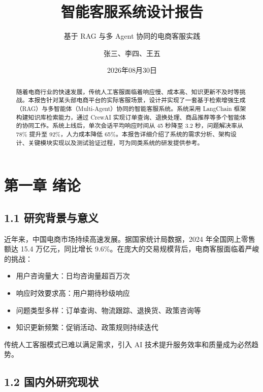\documentclass{harryopo-report}
\title{智能客服系统设计报告}
\subtitle{基于 RAG 与多 Agent 协同的电商客服实践}
\author{张三、李四、王五}
\institute{计算机学院 计算机应用技术}
\date{2026年08月30日}
\begin{document}
\maketitle

\begin{abstract}
随着电商行业的快速发展，传统人工客服面临着响应慢、成本高、知识更新不及时等挑战。本报告针对某头部电商平台的实际客服场景，设计并实现了一套基于检索增强生成（RAG）与多智能体（Multi-Agent）协同的智能客服系统。系统采用 LangChain 框架构建知识库检索能力，通过 CrewAI 实现订单查询、退换处理、商品推荐等多个智能体的协同工作。系统上线后，单次会话平均响应时间从 45 秒降至 3.2 秒，问题解决率从 78\% 提升至 92\%，人力成本降低 65\%。本报告详细介绍了系统的需求分析、架构设计、关键模块实现以及测试验证过程，可为同类系统的研发提供参考。
\end{abstract}

\tableofcontents

\chapter*{第一章 绪论}

\section*{1.1 研究背景与意义}

近年来，中国电商市场持续高速发展。据国家统计局数据，2024 年全国网上零售额达 15.4 万亿元，同比增长 9.6\%。在庞大的交易规模背后，电商客服面临着严峻的挑战：

\begin{itemize}
  \item {\fzht 用户咨询量大}：日均咨询量超百万次
  \item {\fzht 响应时效要求高}：用户期待秒级响应
  \item {\fzht 问题类型多样}：订单查询、物流跟踪、退换货、政策咨询等
  \item {\fzht 知识更新频繁}：促销活动、政策规则持续迭代
\end{itemize}

传统人工客服模式已难以满足需求，引入 AI 技术提升服务效率和质量成为必然趋势。

\section*{1.2 国内外研究现状}
\end{document}
